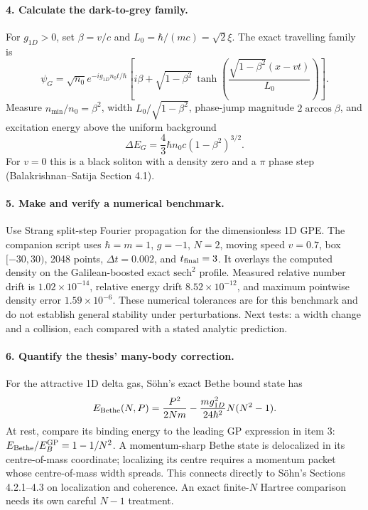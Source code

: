 \documentclass[11pt,a4paper]{article}
\begin{document}
\paragraph{4. Calculate the dark-to-grey family.}
For $g_{1D}>0$, set $\beta=v/c$ and $L_0=\hbar/(mc)=\sqrt2\xi$. The exact travelling family is
\[
\psi_G=\sqrt{n_0}e^{-ig_{1D}n_0t/\hbar}
\left[i\beta+\sqrt{1-\beta^2}\,
\tanh\!\left(\frac{\sqrt{1-\beta^2}(x-vt)}{L_0}\right)\right].
\]
Measure $n_{\min}/n_0=\beta^2$, width $L_0/\sqrt{1-\beta^2}$, phase-jump magnitude $2\arccos\beta$, and excitation energy above the uniform background
\[
\Delta E_G=\frac43\hbar n_0c(1-\beta^2)^{3/2}.
\]
For $v=0$ this is a black soliton with a density zero and a $\pi$ phase step (Balakrishnan--Satija Section 4.1).

\paragraph{5. Make and verify a numerical benchmark.}
Use Strang split-step Fourier propagation for the dimensionless 1D GPE. The companion script uses $\hbar=m=1$, $g=-1$, $N=2$, moving speed $v=0.7$, box $[-30,30)$, 2048 points, $\Delta t=0.002$, and $t_{\rm final}=3$. It overlays the computed density on the Galilean-boosted exact $\mathrm{sech}^2$ profile. Measured relative number drift is $1.02\times10^{-14}$, relative energy drift $8.52\times10^{-12}$, and maximum pointwise density error $1.59\times10^{-6}$. These numerical tolerances are for this benchmark and do not establish general stability under perturbations. Next tests: a width change and a collision, each compared with a stated analytic prediction.

\paragraph{6. Quantify the thesis' many-body correction.}
For the attractive 1D delta gas, S\"ohn's exact Bethe bound state has
\[
E_{\rm Bethe}(N,P)=\frac{P^2}{2Nm}-\frac{mg_{1D}^2}{24\hbar^2}N(N^2-1).
\]
At rest, compare its binding energy to the leading GP expression in item 3: $E_{\rm Bethe}/E_B^{\rm GP}=1-1/N^2$. A momentum-sharp Bethe state is delocalized in its centre-of-mass coordinate; localizing its centre requires a momentum packet whose centre-of-mass width spreads. This connects directly to S\"ohn's Sections 4.2.1--4.3 on localization and coherence. An exact finite-$N$ Hartree comparison needs its own careful $N-1$ treatment.
\end{document}
